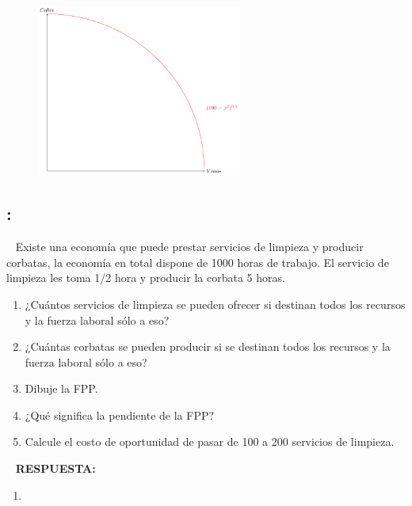 \documentclass[
  letterpaper,
  DIV=11,
  numbers=noendperiod]{scrreport}
\providecommand{\tightlist}{%
  \setlength{\itemsep}{0pt}\setlength{\parskip}{0pt}}\usepackage{longtable,booktabs,array}
\begin{document}
\begin{figure}

{\centering \includegraphics[width=0.6\textwidth,height=\textheight]{7,8titulo_files/figure-pdf/unnamed-chunk-7-1.pdf}

}

\end{figure}

\hypertarget{section-2}{%
\subsection{:}\label{section-2}}

~ Existe una economía que puede prestar servicios de limpieza y producir
corbatas, la economía en total dispone de 1000 horas de trabajo. El
servicio de limpieza les toma 1/2 hora y producir la corbata 5 horas.

\begin{enumerate}
\def\labelenumi{\alph{enumi})}
\tightlist
\item
  ¿Cuántos servicios de limpieza se pueden ofrecer si destinan todos los
  recursos y la fuerza laboral sólo a eso?
\item
  ¿Cuántas corbatas se pueden producir si se destinan todos los recursos
  y la fuerza laboral sólo a eso?
\item
  Dibuje la FPP.
\item
  ¿Qué significa la pendiente de la FPP?
\item
  Calcule el costo de oportunidad de pasar de 100 a 200 servicios de
  limpieza.
\end{enumerate}

~ \textbf{RESPUESTA:}

\begin{enumerate}
\def\labelenumi{\alph{enumi})}
\tightlist
\item
\end{enumerate}
\end{document}
